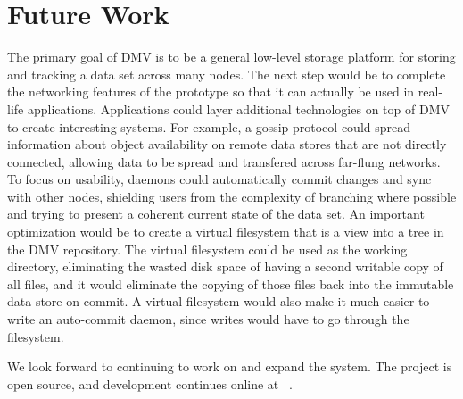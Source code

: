 \chapter{Future Work}

The primary goal of \gls{DMV} is to be a general low-level storage platform for
storing and tracking a data set across many nodes. The next step would be to
complete the networking features of the prototype so that it can actually be
used in real-life applications. Applications could layer additional technologies
on top of \gls{DMV} to create interesting systems. For example, a gossip
protocol could spread information about object availability on remote data
stores that are not directly connected, allowing data to be spread and
transfered across far-flung networks. To focus on usability, daemons could
automatically \gls{commit} changes and sync with other nodes, shielding users
from the complexity of branching where possible and trying to present a coherent
current state of the data set. An important optimization would be to create a
virtual filesystem that is a view into a \gls{tree} in the \gls{DMV} repository.
The virtual filesystem could be used as the working directory, eliminating the
wasted disk space of having a second writable copy of all files, and it would
eliminate the copying of those files back into the immutable data store on
\gls{commit}. A virtual filesystem would also make it much easier to write an
auto-\gls{commit} daemon, since writes would have to go through the filesystem.

We look forward to continuing to work on and expand the system. The project is
open source, and development continues online at \dmvurl~.
